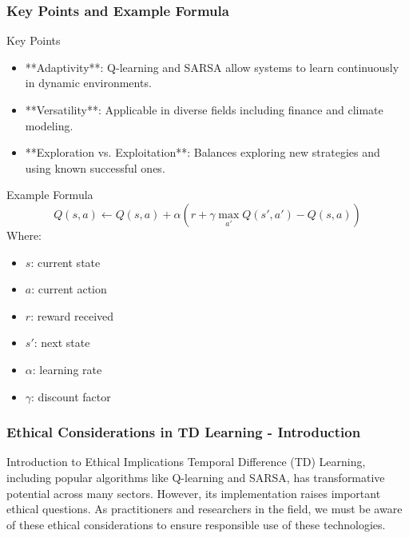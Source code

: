 \documentclass[aspectratio=169]{beamer}
\begin{document}
\begin{frame}[fragile]
    \frametitle{Key Points and Example Formula}
    \begin{block}{Key Points}
        \begin{itemize}
            \item **Adaptivity**: Q-learning and SARSA allow systems to learn continuously in dynamic environments.
            \item **Versatility**: Applicable in diverse fields including finance and climate modeling.
            \item **Exploration vs. Exploitation**: Balances exploring new strategies and using known successful ones.
        \end{itemize}
    \end{block}
    \begin{block}{Example Formula}
        \begin{equation}
        Q(s, a) \gets Q(s, a) + \alpha \left( r + \gamma \max_{a'} Q(s', a') - Q(s, a) \right)
        \end{equation}
        Where:
        \begin{itemize}
            \item $s$: current state
            \item $a$: current action
            \item $r$: reward received
            \item $s'$: next state
            \item $\alpha$: learning rate
            \item $\gamma$: discount factor
        \end{itemize}
    \end{block}
\end{frame}

\begin{frame}[fragile]
    \frametitle{Ethical Considerations in TD Learning - Introduction}
    \begin{block}{Introduction to Ethical Implications}
        Temporal Difference (TD) Learning, including popular algorithms like Q-learning and SARSA, has transformative potential across many sectors. 
        However, its implementation raises important ethical questions. 
        As practitioners and researchers in the field, we must be aware of these ethical considerations to ensure responsible use of these technologies.
    \end{block}
\end{frame}
\end{document}
